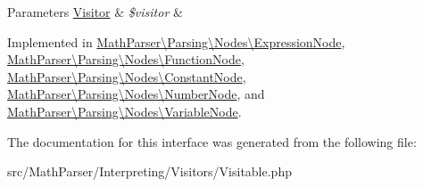 \begin{DoxyParams}[1]{Parameters}
\hyperlink{interfaceMathParser_1_1Interpreting_1_1Visitors_1_1Visitor}{Visitor} & {\em \$visitor} & \\
\hline
\end{DoxyParams}


Implemented in \hyperlink{classMathParser_1_1Parsing_1_1Nodes_1_1ExpressionNode_a3794b9185ed7928df1f39ec42c557106}{Math\-Parser\textbackslash{}\-Parsing\textbackslash{}\-Nodes\textbackslash{}\-Expression\-Node}, \hyperlink{classMathParser_1_1Parsing_1_1Nodes_1_1FunctionNode_a9796a0fdaf49525adc9ea539b4291835}{Math\-Parser\textbackslash{}\-Parsing\textbackslash{}\-Nodes\textbackslash{}\-Function\-Node}, \hyperlink{classMathParser_1_1Parsing_1_1Nodes_1_1ConstantNode_a5debc023d33ccf262a4c73569b4af841}{Math\-Parser\textbackslash{}\-Parsing\textbackslash{}\-Nodes\textbackslash{}\-Constant\-Node}, \hyperlink{classMathParser_1_1Parsing_1_1Nodes_1_1NumberNode_afe0acdb60d40d8f053a00cddef53a2d4}{Math\-Parser\textbackslash{}\-Parsing\textbackslash{}\-Nodes\textbackslash{}\-Number\-Node}, and \hyperlink{classMathParser_1_1Parsing_1_1Nodes_1_1VariableNode_a1c41ef12cc6469a2de9c2de325cf6258}{Math\-Parser\textbackslash{}\-Parsing\textbackslash{}\-Nodes\textbackslash{}\-Variable\-Node}.



The documentation for this interface was generated from the following file\-:\begin{DoxyCompactItemize}
\item 
src/\-Math\-Parser/\-Interpreting/\-Visitors/Visitable.\-php\end{DoxyCompactItemize}
